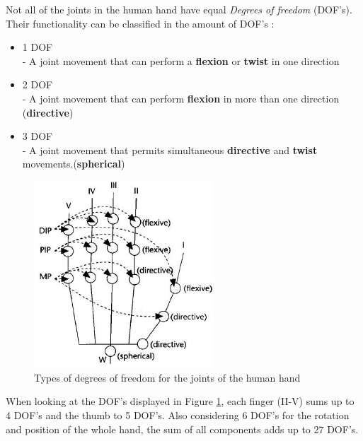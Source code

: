 Not all of the joints in the human hand have equal \textit{Degrees of freedom} (DOF's). Their functionality can be classified in the amount of DOF's \cite{KOREIN.1985}:
\begin{flushleft}
\begin{itemize}
\item 1 DOF \\
- A joint movement that can perform a \textbf{flexion} or \textbf{twist} in one direction
\item 2 DOF \\
- A joint movement that can perform \textbf{flexion} in more than one direction (\textbf{directive})
\item 3 DOF\\
- A joint movement that permits simultaneous \textbf{directive} and \textbf{twist} movements.(\textbf{spherical})
\end{itemize}
\end{flushleft}
\begin{figure}[H]
\centering
\includegraphics[width=0.6\textwidth]{images/Hand_DOFs.JPG} 
\caption{Types of degrees of freedom for the joints of the human hand}
\label{img:dof_image} 
\end{figure}
When looking at the DOF's displayed in Figure \ref{img:dof_image}, each finger (II-V) sums up to 4 DOF's and the thumb to 5 DOF's. Also considering 6 DOF's for the rotation and position of the whole hand, the sum of all components adds up to 27 DOF's.
